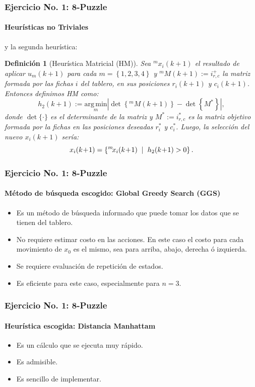 \documentclass[aspectratio=169]{beamer}
\newtheorem{definicion}{Definici\'on}
\begin{document}
\begin{frame}
\frametitle{Ejercicio No. 1: 8-Puzzle}
\framesubtitle{Heurísticas no Triviales}
y la segunda heurística:
\begin{definicion}[Heurística Matricial (HM)]
Sea $^m\!x_i(k\!+\!1)$ el resultado de aplicar $u_m(k\!+\!1)$ para cada $m\!=\!\left\{1,2,3,4\right\}$ y $^m\!M\!(k\!+\!1)\!:=\!i_{r,c}^{+}$
la matriz formada por las fichas $i$ del tablero, en sus posiciones $r_i(k\!+\!1)$ y $c_i(k\!+\!1)$. Entonces definimos HM como:
\begin{equation*}
h_2(k\!+\!1) := \underset{m}{\mathrm{arg\,min}}\left|\det\!\left\{^m\!M\!(k\!+\!1)\right\} - \det\!\left\{M^*\right\}\right|,
\end{equation*}
donde $\det\{\cdot\}$ es el determinante de la matriz y $M^*\!:=\!i_{r,c}^*$ es la matriz objetivo formada por la fichas en las posiciones deseadas $r_i^*$ y $c_i^*$. Luego, la selección del nuevo $x_i(k\!+\!1)$ sería:
\begin{equation*}
x_i(k\!+\!1) = \left\{^m\!x_i(k\!+\!1) \hspace{.2cm} | \hspace{.2cm} h_2(k\!+\!1)>0\right\}.
\end{equation*}
\end{definicion}
\end{frame}
\begin{frame}
\frametitle{Ejercicio No. 1: 8-Puzzle}
\framesubtitle{Método de búsqueda escogido: Global Greedy Search (GGS)}
\begin{itemize}
\item Es un método de búsqueda informado que puede tomar los datos que se tienen del tablero.
\item No requiere estimar costo en las acciones. En este caso el costo para cada movimiento de $x_0$ es el mismo,
sea para arriba, abajo, derecha ó izquierda.
\item Se requiere evaluación de repetición de estados.
\item Es eficiente para este caso, especialmente para $n=3$.
\end{itemize}
\end{frame}
\begin{frame}
\frametitle{Ejercicio No. 1: 8-Puzzle}
\framesubtitle{Heurística escogida: Distancia Manhattam}
\begin{itemize}
\item Es un cálculo que se ejecuta muy rápido.
\item Es admisible.
\item Es sencillo de implementar.
\end{itemize}
\end{frame}
\end{document}
